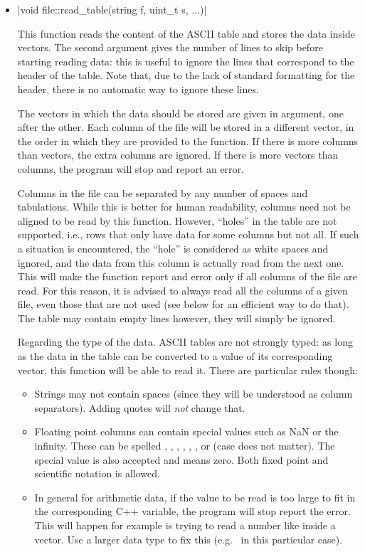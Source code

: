 \documentclass[12pt]{report}
\begin{document}
\begin{itemize}
\item \cppinline|void file::read_table(string f, uint_t s, ...)| 

This function reads the content of the ASCII table  and stores the data inside vectors. The second argument  gives the number of lines to skip before starting reading data: this is useful to ignore the lines that correspond to the header of the table. Note that, due to the lack of standard formatting for the header, there is no automatic way to ignore these lines.

The vectors in which the data should be stored are given in argument, one after the other. Each column of the file will be stored in a different vector, in the order in which they are provided to the function. If there is more columns than vectors, the extra columns are ignored. If there is more vectors than columns, the program will stop and report an error.

Columns in the file can be separated by any number of spaces and tabulations. While this is better for human readability, columns need not be aligned to be read by this function. However, ``holes'' in the table are not supported, i.e., rows that only have data for some columns but not all. If such a situation is encountered, the ``hole'' is considered as white spaces and ignored, and the data from this column is actually read from the next one. This will make the function report and error only if all columns of the file are read. For this reason, it is advised to always read all the columns of a given file, even those that are not used (see below for an efficient way to do that). The table may contain empty lines however, they will simply be ignored.

Regarding the type of the data. ASCII tables are not strongly typed: as long as the data in the table can be converted to a value of its corresponding vector, this function will be able to read it. There are particular rules though:
\begin{itemize}
\item Strings may not contain spaces (since they will be understood as column separators). Adding quotes  will \emph{not} change that.
\item Floating point columns can contain special values such as NaN or the infinity. These can be spelled , , , , , ,  or  (case does not matter). The special value  is also accepted and means zero. Both fixed point and scientific notation is allowed.
\item In general for arithmetic data, if the value to be read is too large to fit in the corresponding C++ variable, the program will stop report the error. This will happen for example is trying to read a number like  inside a  vector. Use a larger data type to fix this (e.g.~ in this particular case).
\end{itemize}


\end{itemize}
\end{document}
